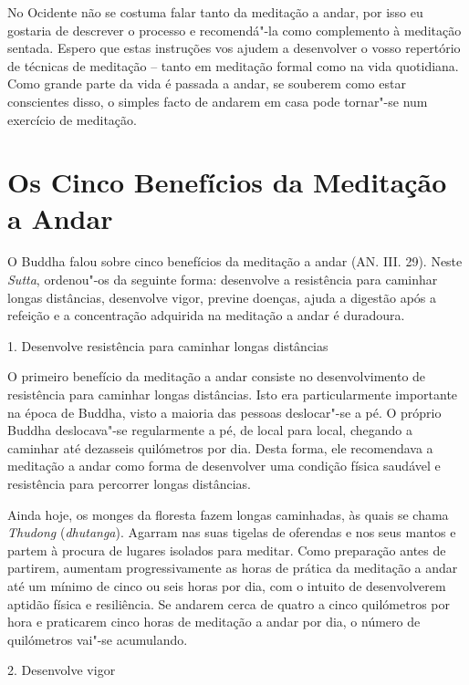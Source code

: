 No Ocidente não se costuma falar tanto da meditação a andar, por isso eu
gostaria de descrever o processo e recomendá"-la como complemento à
meditação sentada. Espero que estas instruções vos ajudem a desenvolver
o vosso repertório de técnicas de meditação -- tanto em meditação formal
como na vida quotidiana. Como grande parte da vida é passada a andar, se
souberem como estar conscientes disso, o simples facto de andarem em
casa pode tornar"-se num exercício de meditação.

\section{Os Cinco Benefícios da Meditação a Andar}

O Buddha falou sobre cinco benefícios da meditação a andar (AN. III. 29). Neste
\emph{Sutta}, ordenou"-os da seguinte forma: desenvolve a resistência para
caminhar longas distâncias, desenvolve vigor, previne doenças, ajuda a digestão
após a refeição e a concentração adquirida na meditação a andar é duradoura.

\begin{siderule-quote}
  1. Desenvolve resistência para caminhar longas distâncias
\end{siderule-quote}

O primeiro benefício da meditação a andar consiste no desenvolvimento de
resistência para caminhar longas distâncias. Isto era particularmente
importante na época de Buddha, visto a maioria das pessoas
deslocar"-se a pé. O próprio Buddha deslocava"-se regularmente a
pé, de local para local, chegando a caminhar até dezasseis quilómetros
por dia. Desta forma, ele recomendava a meditação a andar como forma de
desenvolver uma condição física saudável e resistência para percorrer
longas distâncias.

Ainda hoje, os monges da floresta fazem longas caminhadas, às quais se
chama \emph{Thudong} (\emph{dhutanga}). Agarram nas suas tigelas de
oferendas e nos seus mantos e partem à procura de lugares isolados para
meditar. Como preparação antes de partirem, aumentam progressivamente as
horas de prática da meditação a andar até um mínimo de cinco ou seis
horas por dia, com o intuito de desenvolverem aptidão física e
resiliência. Se andarem cerca de quatro a cinco quilómetros por hora e
praticarem cinco horas de meditação a andar por dia, o número de
quilómetros vai"-se acumulando.

\begin{siderule-quote}
  2. Desenvolve vigor
\end{siderule-quote}

